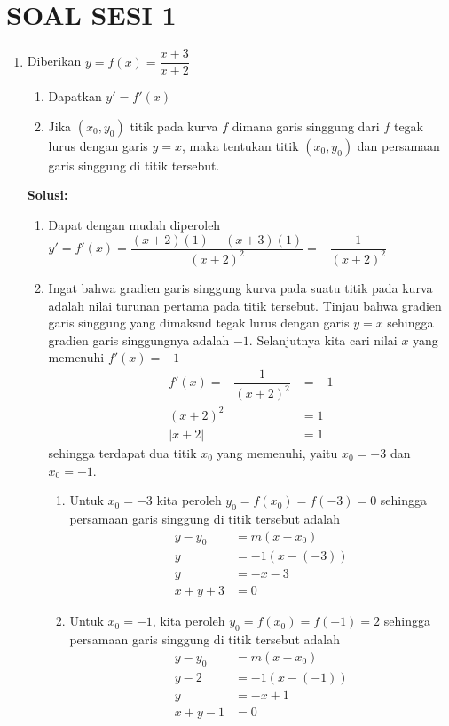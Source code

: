 \documentclass{article}
\begin{document}
\section*{SOAL SESI 1}
\begin{enumerate}
	\item Diberikan $y=f(x)=\dfrac{x+3}{x+2}$
	\begin{enumerate}
		\item Dapatkan $y'=f'(x)$
		\item Jika $(x_0,y_0)$ titik pada kurva $f$ dimana garis singgung dari $f$ tegak lurus dengan garis $y=x$, maka tentukan titik $(x_0,y_0)$ dan persamaan garis singgung di titik tersebut.
	\end{enumerate}
	\textbf{Solusi:}
	\begin{enumerate}
		\item Dapat dengan mudah diperoleh $y'=f'(x)=\dfrac{(x+2)(1)-(x+3)(1)}{(x+2)^2} = -\dfrac{1}{(x+2)^2}$
		\item Ingat bahwa gradien garis singgung kurva pada suatu titik pada kurva adalah nilai turunan pertama pada titik tersebut. Tinjau bahwa gradien garis singgung yang dimaksud tegak lurus dengan garis $y=x$ sehingga gradien garis singgungnya adalah $-1$. Selanjutnya kita cari nilai $x$ yang memenuhi $f'(x)=-1$
		\begin{align*}
		f'(x) = -\dfrac{1}{(x+2)^2} &= -1 \\
		(x+2)^2 &=1\\
		|x+2| &= 1 
		\end{align*}
		sehingga terdapat dua titik $x_0$ yang memenuhi, yaitu $x_0=-3$ dan $x_0=-1$. 
		\begin{enumerate}
			\item Untuk $x_0=-3$ kita peroleh $y_0=f(x_0)=f(-3)=0$ sehingga persamaan garis singgung di titik tersebut adalah 
			\begin{align*}
			y-y_0 &= m(x-x_0) \\
			y &= -1(x-(-3)) \\
			y &= -x-3 \\
			x+y +3&= 0
			\end{align*}
			\item Untuk $x_0=-1$, kita peroleh $y_0=f(x_0)=f(-1)=2$ sehingga persamaan garis singgung di titik tersebut adalah 
			\begin{align*}
			y-y_0 &= m(x-x_0)\\
			y-2 &= -1(x-(-1)) \\
			y &= -x+1 \\
			x+y-1 &= 0
			\end{align*}

\end{enumerate}
\end{enumerate}
\end{enumerate}
\end{document}
